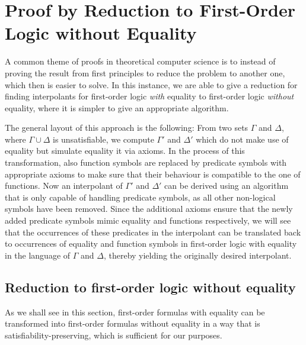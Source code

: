 \chapter{Proof by Reduction to First-Order Logic without Equality}

A common theme of proofs in theoretical computer science is to instead of proving the result from first principles to reduce the problem to another one, which then is easier to solve.
In this instance, we are able to give a reduction for finding interpolants for first-order logic \emph{with} equality to first-order logic \emph{without} equality, where it is simpler to give an appropriate algorithm.

The general layout of this approach is the following:
From two sets $\Gamma$ and $\Delta$, where $\Gamma \cup \Delta$ is unsatisfiable, we compute $\Gamma'$ and $\Delta'$ which do not make use of equality but simulate equality it via axioms.
In the process of this transformation, also function symbols are replaced by predicate symbols with appropriate axioms to make sure that their behaviour is compatible to the one of functions.
Now an interpolant of $\Gamma'$ and $\Delta'$ can be derived using an algorithm that is only capable of handling predicate symbols, as all other non-logical symbols have been removed.
Since the additional axioms ensure that the newly added predicate symbols mimic equality and functions respectively, we will see that the occurrences of these predicates in the interpolant can be translated back to occurrences of equality and function symbols in first-order logic with equality in the language of $\Gamma$ and $\Delta$, thereby yielding the originally desired interpolant.


\section{Reduction to first-order logic without equality}

As we shall see in this section, first-order formulas with equality can be transformed into first-order formulas without equality in a way that is satisfiability-preserving, which is sufficient for our purposes.

